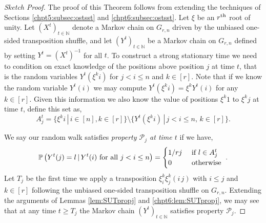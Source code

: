 \documentclass[11pt]{report}
\begin{document}
\begin{proof}[Sketch Proof]
	The proof of this Theorem follows from extending the techniques of Sections 	\ref{chpt5:subsec:ostsst} and \ref{chpt6:subsec:ostsst}. Let $\xi$ be an $r^{\textnormal{th}}$ root of unity. Let $(X^{t})_{t\in 	\mathbb{N}}$ denote a Markov chain on $G_{r,n}$ driven by the unbiased one-sided transposition shuffle, and let $(Y^{t})_{t \in \mathbb{N}}$ be a Markov chain on $G_{r,n}$ defined by setting $Y^{t} = (X^{t})^{-1}$ for all $t$.  To construct a strong stationary time we need to condition on exact knowledge of the positions above position $j$  at time $t$, that is the random variables $Y^{t}(\xi^{k} i)$ for $j< i  \leq n$ and $k\in [r]$. Note that if we know the random variable $Y^{t}(i)$ we may compute $Y^{t}(\xi^{k} i) = \xi^{k} Y^{t}(i)$ for any $k \in [r]$.
	Given this information we also know the value of positions $\xi^{k} 1$ to $\xi^{k}j$ at time $t$, define this set as, 
	\[A_{j}^{t} = \{\xi^{k} i  \,| \, i\in [n], k \in [r] \} \setminus \{ Y^{t}(\xi^{k} i)  \, | \, j < i \leq n, \, k \in [r]\}.\]
	
	We say our random walk satisfies \emph{property $\mathcal{P}_{j}$ at time $t$} if we have,
	\begin{eqnarray}
	\mathbb{P}\left(Y^{t} (j) = l \, | \, Y^{t}(i) \textnormal{ for all } j<i \leq n \right) = 
	\begin{cases}
	1/rj & \textnormal{ if } l \in A_{j}^{t} \\
	0 & \textnormal{ otherwise } 
	\end{cases} .\label{chpt6:eqn:propertyjgeneral}
	\end{eqnarray}
	Let $T_{j}$ be the first time we apply a transposition $\xi_{i}^{k}\xi_{j}^{k}(i \, j)$ with $i \leq j$ and  $k \in [r]$ following the unbiased one-sided transposition shuffle on $G_{r,n}$. Extending the arguments of Lemmas \ref{lem:SUTpropj} and \ref{chpt6:lem:SUTpropj}, we may see that at any time $t \geq T_{j}$ the Markov chain $(Y^{t})_{t\in\mathbb{N}}$ satisfies property $\mathcal{P}_{j}$.
	

\end{proof}
\end{document}
